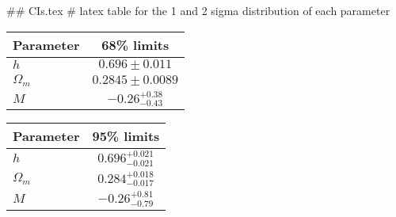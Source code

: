 ## CIs.tex
# latex table for the 1 and 2 sigma distribution of each parameter

\begin{tabular} { l  c}
 Parameter &  68\% limits\\
\hline
{\boldmath$h              $} & $0.696\pm 0.011            $\\
{\boldmath$\Omega_m       $} & $0.2845\pm 0.0089          $\\
{\boldmath$M              $} & $-0.26^{+0.38}_{-0.43}     $\\
\hline
\end{tabular}

\begin{tabular} { l  c}
 Parameter &  95\% limits\\
\hline
{\boldmath$h              $} & $0.696^{+0.021}_{-0.021}   $\\
{\boldmath$\Omega_m       $} & $0.284^{+0.018}_{-0.017}   $\\
{\boldmath$M              $} & $-0.26^{+0.81}_{-0.79}     $\\
\hline
\end{tabular}
